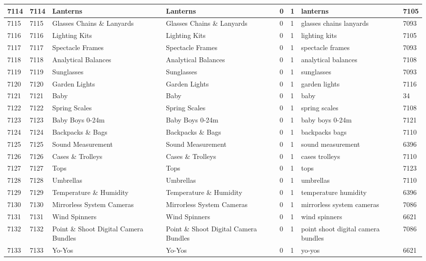 \begin{longtable}{|l|l|l|l|l|l|l|l|}
7114 & 7114 & Lanterns & Lanterns & 0 & 1 & lanterns & 7105 \\ \hline 
7115 & 7115 & Glasses Chains \& Lanyards & Glasses Chains \& Lanyards & 0 & 1 & glasses chains lanyards & 7093 \\ \hline 
7116 & 7116 & Lighting Kits & Lighting Kits & 0 & 1 & lighting kits & 7105 \\ \hline 
7117 & 7117 & Spectacle Frames & Spectacle Frames & 0 & 1 & spectacle frames & 7093 \\ \hline 
7118 & 7118 & Analytical Balances & Analytical Balances & 0 & 1 & analytical balances & 7108 \\ \hline 
7119 & 7119 & Sunglasses & Sunglasses & 0 & 1 & sunglasses & 7093 \\ \hline 
7120 & 7120 & Garden Lights & Garden Lights & 0 & 1 & garden lights & 7116 \\ \hline 
7121 & 7121 & Baby & Baby & 0 & 1 & baby & 34 \\ \hline 
7122 & 7122 & Spring Scales & Spring Scales & 0 & 1 & spring scales & 7108 \\ \hline 
7123 & 7123 & Baby Boys 0-24m & Baby Boys 0-24m & 0 & 1 & baby boys 0-24m & 7121 \\ \hline 
7124 & 7124 & Backpacks \& Bags & Backpacks \& Bags & 0 & 1 & backpacks bags & 7110 \\ \hline 
7125 & 7125 & Sound Measurement & Sound Measurement & 0 & 1 & sound measurement & 6396 \\ \hline 
7126 & 7126 & Cases \& Trolleys & Cases \& Trolleys & 0 & 1 & cases trolleys & 7110 \\ \hline 
7127 & 7127 & Tops & Tops & 0 & 1 & tops & 7123 \\ \hline 
7128 & 7128 & Umbrellas & Umbrellas & 0 & 1 & umbrellas & 7110 \\ \hline 
7129 & 7129 & Temperature \& Humidity & Temperature \& Humidity & 0 & 1 & temperature humidity & 6396 \\ \hline 
7130 & 7130 & Mirrorless System Cameras & Mirrorless System Cameras & 0 & 1 & mirrorless system cameras & 7086 \\ \hline 
7131 & 7131 & Wind Spinners & Wind Spinners & 0 & 1 & wind spinners & 6621 \\ \hline 
7132 & 7132 & Point \& Shoot Digital Camera Bundles & Point \& Shoot Digital Camera Bundles & 0 & 1 & point shoot digital camera bundles & 7086 \\ \hline 
7133 & 7133 & Yo-Yos & Yo-Yos & 0 & 1 & yo-yos & 6621 \\ \hline 

\end{longtable}
